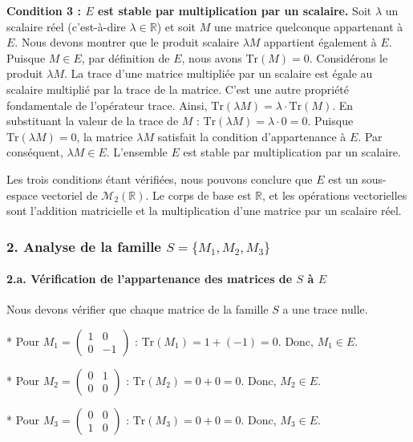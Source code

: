 \documentclass{report}
\begin{document}
\textbf{Condition 3 : $E$ est stable par multiplication par un scalaire.}
Soit $\lambda$ un scalaire réel (c'est-à-dire $\lambda \in \mathbb{R}$) et soit $M$ une matrice quelconque appartenant à $E$. Nous devons montrer que le produit scalaire $\lambda M$ appartient également à $E$.
Puisque $M \in E$, par définition de $E$, nous avons $\text{Tr}(M) = 0$.
Considérons le produit $\lambda M$. La trace d'une matrice multipliée par un scalaire est égale au scalaire multiplié par la trace de la matrice. C'est une autre propriété fondamentale de l'opérateur trace.
Ainsi, $\text{Tr}(\lambda M) = \lambda \cdot \text{Tr}(M)$.
En substituant la valeur de la trace de $M$ :
$\text{Tr}(\lambda M) = \lambda \cdot 0 = 0$.
Puisque $\text{Tr}(\lambda M) = 0$, la matrice $\lambda M$ satisfait la condition d'appartenance à $E$.
Par conséquent, $\lambda M \in E$. L'ensemble $E$ est stable par multiplication par un scalaire.

Les trois conditions étant vérifiées, nous pouvons conclure que $E$ est un sous-espace vectoriel de $\mathcal{M}_2(\mathbb{R})$. Le corps de base est $\mathbb{R}$, et les opérations vectorielles sont l'addition matricielle et la multiplication d'une matrice par un scalaire réel.

\subsubsection*{2. Analyse de la famille $S = \{M_1, M_2, M_3\}$}

\paragraph*{2.a. Vérification de l'appartenance des matrices de $S$ à $E$}

Nous devons vérifier que chaque matrice de la famille $S$ a une trace nulle.

*   Pour $M_1 = \begin{pmatrix} 1 & 0 \\ 0 & -1 \end{pmatrix}$ :
    $\text{Tr}(M_1) = 1 + (-1) = 0$.
    Donc, $M_1 \in E$.

*   Pour $M_2 = \begin{pmatrix} 0 & 1 \\ 0 & 0 \end{pmatrix}$ :
    $\text{Tr}(M_2) = 0 + 0 = 0$.
    Donc, $M_2 \in E$.

*   Pour $M_3 = \begin{pmatrix} 0 & 0 \\ 1 & 0 \end{pmatrix}$ :
    $\text{Tr}(M_3) = 0 + 0 = 0$.
    Donc, $M_3 \in E$.
\end{document}
